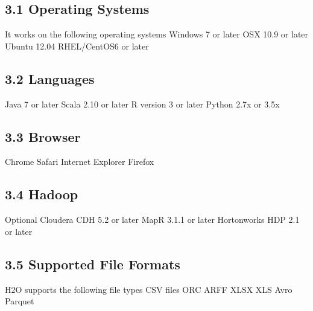 \documentclass[9pt,twocolumn,twoside]{../../styles/osajnl}
\begin{document}
\subsection{3.1 Operating Systems}

It works on the following operating systems 
\newline Windows 7 or later
\newline OSX 10.9 or later
\newline Ubuntu 12.04
\newline RHEL/CentOS6 or later\cite{www-h2o-requirements}

\subsection{3.2 Languages}

 Java 7 or later
\newline Scala 2.10 or later
\newline R version 3 or later
\newline Python 2.7x or 3.5x\cite{www-h2o-requirements}
 
\subsection{3.3 Browser}

 Chrome
\newline Safari
\newline Internet Explorer
\newline Firefox\cite{www-h2o-requirements}

\subsection{3.4 Hadoop}
 Optional Cloudera CDH 5.2 or later
\newline MapR 3.1.1 or later
\newline Hortonworks HDP 2.1 or later\cite{www-h2o-requirements}

\subsection{3.5 Supported File Formats}
H2O supports the following file types
\newline CSV files
\newline ORC
\newline ARFF
\newline XLSX
\newline XLS
\newline Avro
\newline Parquet\cite{www-h2o-requirements}
\end{document}
